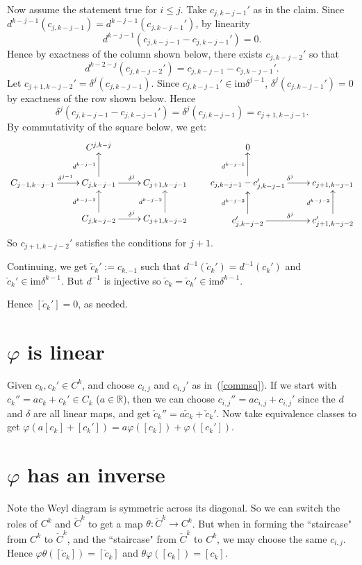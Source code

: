 \documentclass[12pt]{article}
\theoremstyle{norm}
\newcommand{\R}[0]{\mathbb{R}}
\newcommand{\de}[0]{\delta}
\newcommand{\ph}[0]{\varphi}
\newcommand{\im}[0]{\text{im}}
\begin{document}
Now assume the statement true for $i\le j$. Take $c_{j,k-j-1}'$ as in the claim. Since $d^{k-j-1}(c_{j,k-j-1})=d^{k-j-1}(c_{j,k-j-1}')$, by linearity 
\[d^{k-j-1}(c_{j,k-j-1}-c_{j,k-j-1}')=0.\]
Hence by exactness of the column shown below, there exists $c_{j,k-j-2}'$ so that 
\[d^{k-2-j}(c_{j,k-j-2}')=c_{j,k-j-1}-c_{j,k-j-1}'.\]
Let $c_{j+1,k-j-2}'=\de^{j}(c_{j,k-j-1})$. 
Since $c_{j,k-j-1}'\in \im \de^{j-1}$, $\de^{j}(c_{j,k-j-1}')=0$ by exactness of the row shown below. Hence 
\[
\de^{j}(c_{j,k-j-1}-c_{j,k-j-1}')=\de^{j}(c_{j,k-j-1})=c_{j+1,k-j-1}.
\]
By commutativity of the square below, we get:
\[
\xymatrix{
&C^{j,k-j}&\\
C_{j-1,k-j-1}\ar[r]^{\de^{j-1}}&C_{j,k-j-1}\ar[u]^{d^{k-j-1}} \ar[r]^{\de^j}
& C_{j+1,k-j-1}\\
&C_{j,k-j-2}\ar[u]^{d^{k-j-2}} \ar[r]^{\de^j}
& C_{j+1,k-j-2}\ar[u]^{d^{k-j-2}}
}\qquad
\xymatrix{
0&\\
c_{j,k-j-1}-c_{j,k-j-1}'\ar[u]^{d^{k-j-1}} \ar[r]^{\de^j}
& c_{j+1,k-j-1}\\
c_{j,k-j-2}'\ar[u]^{d^{k-j-2}} \ar[r]^{\de^j}
& c_{j+1,k-j-2}'\ar[u]^{d^{k-j-2}}
}
\]
So $c_{j+1,k-j-2}'$ satisfies the conditions for $j+1$.

Continuing, we get $\check c_{k}':=c_{k,-1}$ such that $d^{-1}(\check c_k')=d^{-1}(c_k')$ and $\check c_k'\in \im\de^{k-1}$. But $d^{-1}$ is injective so $\check c_k=\check c_k'\in \im\de^{k-1}$.

Hence $[\check c_k']=0$, as needed.
\section{$\ph$ is linear}
Given $c_k,c_k'\in C^k$, and choose $c_{i,j}$ and $c_{i,j}'$ as in~(\ref{commsq}). If we start with $c_k''=ac_k+c_k'\in C_k$ ($a\in \R$), then we can choose $c_{i,j}''=ac_{i,j}+c_{i,j}'$ since the $d$ and $\de$ are all linear maps, and get $\check c_k''=a\check c_k +\check c_k'$. Now take equivalence classes to get $\ph(a[c_k]+[c_k'])=a\ph([c_k])+\ph([c_{k}'])$.
\section{$\ph$ has an inverse}
Note the Weyl diagram is symmetric across its diagonal. So we can switch the roles of $C^k$ and $\check C^k$ to get a map $\theta:\check C^k\to C^k$. But when in forming the ``staircase" from $C^k$ to $\check C^k$, and the ``staircase" from $\check C^k$ to $C^k$, we may choose the same $c_{i,j}$. Hence $\ph\theta ([\check c_k])=[\check c_k]$ and $\theta\ph([c_k])=[c_k]$.
\end{document}
